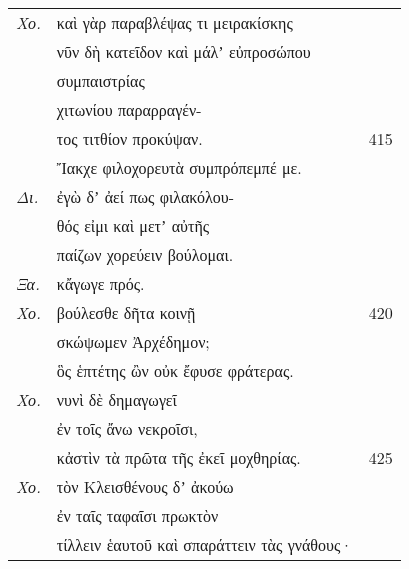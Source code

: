 \documentclass[13pt]{article}
\begin{document}
\begin{greek}
\newpage
\begin{spacing}{1.5}
\begin{tabularx}{\textwidth}{@{}lXr@{}}
\textit{Χο.} & καὶ γὰρ παραβλέψας τι μειρακίσκης &  \\
& νῦν δὴ κατεῖδον καὶ μάλʼ εὐπροσώπου &  \\
& συμπαιστρίας &  \\
& χιτωνίου παραρραγέν- &  \\
& τος τιτθίον προκύψαν. & 415 \\
& Ἴακχε φιλοχορευτὰ συμπρόπεμπέ με. &  \\
\textit{Δι.} & ἐγὼ δʼ ἀεί πως φιλακόλου- &  \\
& θός εἰμι καὶ μετʼ αὐτῆς &  \\
& παίζων χορεύειν βούλομαι. &  \\
\textit{Ξα.} & κἄγωγε πρός. &  \\
\textit{Χο.} & βούλεσθε δῆτα κοινῇ & 420 \\
& σκώψωμεν Ἀρχέδημον; &  \\
& ὃς ἑπτέτης ὢν οὐκ ἔφυσε φράτερας. &  \\
\textit{Χο.} & νυνὶ δὲ δημαγωγεῖ &  \\
& ἐν τοῖς ἄνω νεκροῖσι, &  \\
& κἀστὶν τὰ πρῶτα τῆς ἐκεῖ μοχθηρίας. & 425 \\
\textit{Χο.} & τὸν Κλεισθένους δʼ ἀκούω &  \\
& ἐν ταῖς ταφαῖσι πρωκτὸν &  \\
& τίλλειν ἑαυτοῦ καὶ σπαράττειν τὰς γνάθους· &  \\

\end{tabularx}
\end{spacing}


\end{greek}
\end{document}
